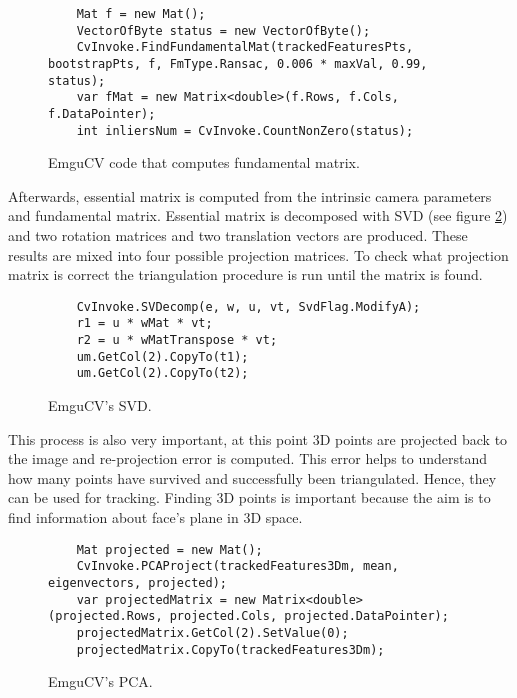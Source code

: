 \documentclass[../../main.tex]{subfiles}
\begin{document}
\begin{figure} [!ht]
\centering    
\lstset{style=sharpc}
    \begin{lstlisting}
    Mat f = new Mat();
    VectorOfByte status = new VectorOfByte();
    CvInvoke.FindFundamentalMat(trackedFeaturesPts, bootstrapPts, f, FmType.Ransac, 0.006 * maxVal, 0.99, status);
    var fMat = new Matrix<double>(f.Rows, f.Cols, f.DataPointer);
    int inliersNum = CvInvoke.CountNonZero(status);
    \end{lstlisting}
\caption{EmguCV code that computes fundamental matrix.}
\label{fig:impl_fundamental_matrix}
\end{figure}

Afterwards, essential matrix is computed from the intrinsic camera parameters and fundamental matrix. Essential matrix is decomposed with \ac{SVD} (see figure \ref{fig:impl_svd}) and two rotation matrices and two translation vectors are produced. These results are mixed into four possible projection matrices. To check what projection matrix is correct the triangulation procedure is run until the matrix is found.

\begin{figure} [!ht]
\centering    
\lstset{style=sharpc}
    \begin{lstlisting}
    CvInvoke.SVDecomp(e, w, u, vt, SvdFlag.ModifyA);   
    r1 = u * wMat * vt;
    r2 = u * wMatTranspose * vt;
    um.GetCol(2).CopyTo(t1);
    um.GetCol(2).CopyTo(t2);
    \end{lstlisting}
\caption{EmguCV's SVD.}
\label{fig:impl_svd}
\end{figure}
 
This process is also very important, at this point 3D points are projected back to the image and re-projection error is computed. This error helps to understand how many points have survived and successfully been triangulated. Hence, they can be used for tracking. Finding 3D points is important because the aim is to find information about face's plane in 3D space. 

\begin{figure} [!ht]
\centering    
\lstset{style=sharpc}
    \begin{lstlisting}
    Mat projected = new Mat();
    CvInvoke.PCAProject(trackedFeatures3Dm, mean, eigenvectors, projected);
    var projectedMatrix = new Matrix<double>(projected.Rows, projected.Cols, projected.DataPointer);
    projectedMatrix.GetCol(2).SetValue(0);
    projectedMatrix.CopyTo(trackedFeatures3Dm);
    \end{lstlisting}
\caption{EmguCV's PCA.}
\label{fig:impl_pca}
\end{figure}
\end{document}
